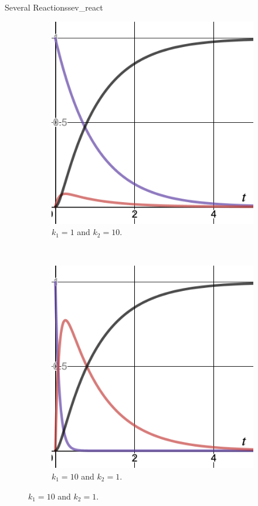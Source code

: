 \begin{ex}{Several Reactions}{sev_react}
\begin{figure}[H]
\begin{subfigure}[h]{0.3\textwidth}
        \includegraphics[width=\textwidth]{Figures_Part_2/k1=1k2=10.png}
        \caption{$k_1=1$ and $k_2=10$.}
    \end{subfigure}
    ~
    \begin{subfigure}[h]{0.3\textwidth}
        \includegraphics[width=\textwidth]{Figures_Part_2/k1=10k2=1.png}
        \caption{$k_1=10$ and $k_2=1$.}
    \end{subfigure}

        \end{figure}
        \end{ex}
        

